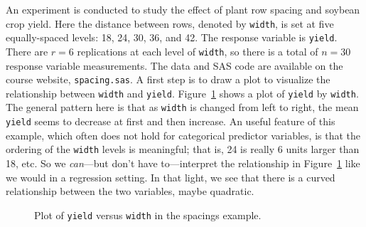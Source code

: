 \documentclass[a4paper, 12pt]{article}
\theoremstyle{plain}
\theoremstyle{definition}
\theoremstyle{remark}
\begin{document}
An experiment is conducted to study the effect of plant row spacing and soybean crop yield.  Here the distance between rows, denoted by {\tt width}, is set at five equally-spaced levels: 18, 24, 30, 36, and 42.  The response variable is {\tt yield}. There are $r=6$ replications at each level of {\tt width}, so there is a total of $n=30$ response variable measurements. The data and SAS code are available on the course website, {\tt spacing.sas}.  A first step is to draw a plot to visualize the relationship between {\tt width} and {\tt yield}.  Figure~\ref{fig:spacing.scatter} shows a plot of {\tt yield} by {\tt width}.  The general pattern here is that as {\tt width} is changed from left to right, the mean {\tt yield} seems to decrease at first and then increase.  An useful feature of this example, which often does not hold for categorical predictor variables, is that the ordering of the {\tt width} levels is meaningful; that is, 24 is really 6 units larger than 18, etc.  So we {\em can}---but don't have to---interpret the relationship in Figure~\ref{fig:spacing.scatter} like we would in a regression setting.  In that light, we see that there is a curved relationship between the two variables, maybe quadratic.  

\begin{figure}[t]
\begin{center}
\end{center}
\caption{Plot of {\tt yield} versus {\tt width} in the spacings example.}
\label{fig:spacing.scatter}
\end{figure}
\end{document}
